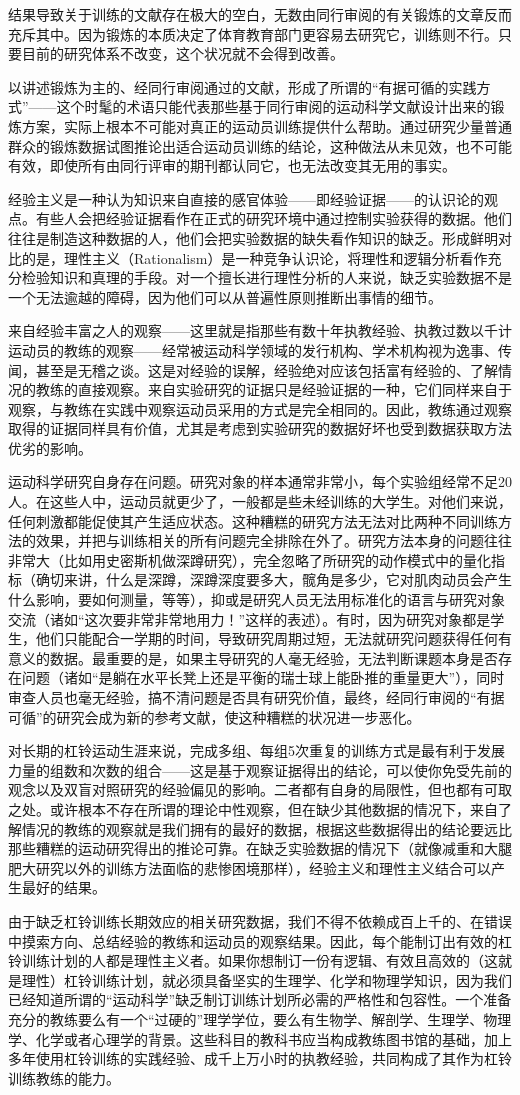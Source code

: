 结果导致关于训练的文献存在极大的空白，无数由同行审阅的有关锻炼的文章反而充斥其中。因为锻炼的本质决定了体育教育部门更容易去研究它，训练则不行。只要目前的研究体系不改变，这个状况就不会得到改善。

以讲述锻炼为主的、经同行审阅通过的文献，形成了所谓的“有据可循的实践方式”——这个时髦的术语只能代表那些基于同行审阅的运动科学文献设计出来的锻炼方案，实际上根本不可能对真正的运动员训练提供什么帮助。通过研究少量普通群众的锻炼数据试图推论出适合运动员训练的结论，这种做法从未见效，也不可能有效，即使所有由同行评审的期刊都认同它，也无法改变其无用的事实。

经验主义是一种认为知识来自直接的感官体验——即经验证据——的认识论的观点。有些人会把经验证据看作在正式的研究环境中通过控制实验获得的数据。他们往往是制造这种数据的人，他们会把实验数据的缺失看作知识的缺乏。形成鲜明对比的是，理性主义（Rationalism）是一种竞争认识论，将理性和逻辑分析看作充分检验知识和真理的手段。对一个擅长进行理性分析的人来说，缺乏实验数据不是一个无法逾越的障碍，因为他们可以从普遍性原则推断出事情的细节。

来自经验丰富之人的观察——这里就是指那些有数十年执教经验、执教过数以千计运动员的教练的观察——经常被运动科学领域的发行机构、学术机构视为逸事、传闻，甚至是无稽之谈。这是对经验的误解，经验绝对应该包括富有经验的、了解情况的教练的直接观察。来自实验研究的证据只是经验证据的一种，它们同样来自于观察，与教练在实践中观察运动员采用的方式是完全相同的。因此，教练通过观察取得的证据同样具有价值，尤其是考虑到实验研究的数据好坏也受到数据获取方法优劣的影响。

运动科学研究自身存在问题。研究对象的样本通常非常小，每个实验组经常不足20人。在这些人中，运动员就更少了，一般都是些未经训练的大学生。对他们来说，任何刺激都能促使其产生适应状态。这种糟糕的研究方法无法对比两种不同训练方法的效果，并把与训练相关的所有问题完全排除在外了。研究方法本身的问题往往非常大（比如用史密斯机做深蹲研究），完全忽略了所研究的动作模式中的量化指标（确切来讲，什么是深蹲，深蹲深度要多大，髋角是多少，它对肌肉动员会产生什么影响，要如何测量，等等），抑或是研究人员无法用标准化的语言与研究对象交流（诸如“这次要非常非常地用力！”这样的表述）。有时，因为研究对象都是学生，他们只能配合一学期的时间，导致研究周期过短，无法就研究问题获得任何有意义的数据。最重要的是，如果主导研究的人毫无经验，无法判断课题本身是否存在问题（诸如“是躺在水平长凳上还是平衡的瑞士球上能卧推的重量更大”），同时审查人员也毫无经验，搞不清问题是否具有研究价值，最终，经同行审阅的“有据可循”的研究会成为新的参考文献，使这种糟糕的状况进一步恶化。

对长期的杠铃运动生涯来说，完成多组、每组5次重复的训练方式是最有利于发展力量的组数和次数的组合——这是基于观察证据得出的结论，可以使你免受先前的观念以及双盲对照研究的经验偏见的影响。二者都有自身的局限性，但也都有可取之处。或许根本不存在所谓的理论中性观察，但在缺少其他数据的情况下，来自了解情况的教练的观察就是我们拥有的最好的数据，根据这些数据得出的结论要远比那些糟糕的运动研究得出的推论可靠。在缺乏实验数据的情况下（就像减重和大腿肥大研究以外的训练方法面临的悲惨困境那样），经验主义和理性主义结合可以产生最好的结果。

由于缺乏杠铃训练长期效应的相关研究数据，我们不得不依赖成百上千的、在错误中摸索方向、总结经验的教练和运动员的观察结果。因此，每个能制订出有效的杠铃训练计划的人都是理性主义者。如果你想制订一份有逻辑、有效且高效的（这就是理性）杠铃训练计划，就必须具备坚实的生理学、化学和物理学知识，因为我们已经知道所谓的“运动科学”缺乏制订训练计划所必需的严格性和包容性。一个准备充分的教练要么有一个“过硬的”理学学位，要么有生物学、解剖学、生理学、物理学、化学或者心理学的背景。这些科目的教科书应当构成教练图书馆的基础，加上多年使用杠铃训练的实践经验、成千上万小时的执教经验，共同构成了其作为杠铃训练教练的能力。
